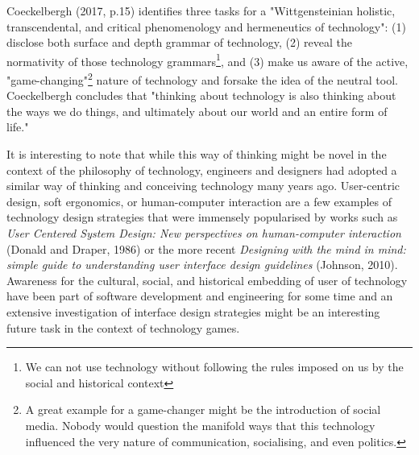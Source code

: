 Coeckelbergh (2017, p.15) identifies three tasks for a "Wittgensteinian holistic, transcendental, and critical phenomenology and hermeneutics of technology": (1) disclose both surface and depth grammar of technology, (2) reveal the normativity of those technology grammars\footnote{We can not use technology without following the rules imposed on us by the social and historical context}, and (3) make us aware of the active, "game-changing"\footnote{A great example for a game-changer might be the introduction of social media. Nobody would question the manifold ways that this technology influenced the very nature of communication, socialising, and even politics.} nature of technology and forsake the idea of the neutral tool. Coeckelbergh concludes that "thinking about technology is also thinking about the
ways we do things, and ultimately about our world and an entire form of life."

It is interesting to note that while this way of thinking might be novel in the context of the philosophy of technology, engineers and designers had adopted a similar way of thinking and conceiving technology many years ago. User-centric design, soft ergonomics, or human-computer interaction are a few examples of technology design
strategies that were immensely popularised by works such as \textit{User Centered System Design: New perspectives on human-computer interaction} (Donald and Draper, 1986) or the more recent \textit{Designing with the mind in mind: simple guide to understanding user interface design guidelines} (Johnson, 2010). Awareness for the cultural, social, and historical embedding of user of technology have been part of software development and engineering for some time and an extensive investigation of interface design strategies might be an interesting future task in the context of technology games.